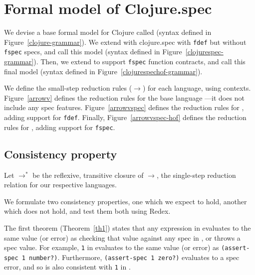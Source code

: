 \chapter{Formal model of Clojure.spec}

%
%

We devise a base formal model for Clojure called \lambdac{}
(syntax defined in Figure~\ref{clojure-grammar}).
We extend \lambdac{} with clojure.spec with \texttt{fdef} but without 
\texttt{fspec} specs, and call
this model \lambdacs{}
(syntax defined in Figure~\ref{clojurespec-grammar}).
Then, we extend \lambdacs{} to support
\texttt{fspec} function contracts, and call this final model \lambdacsf{}
(syntax defined in Figure~\ref{clojurespechof-grammar}).

We define the small-step reduction rules ($\rightarrow$) for each language, using contexts.
Figure~\ref{arrowv} defines the reduction rules for 
the base language \lambdac{}---it does not include any spec features.
Figure~\ref{arrowvspec} defines the reduction rules for 
\lambdacs{}, adding support for \texttt{fdef}.
Finally, Figure~\ref{arrowvspec-hof} defines the reduction rules for 
\lambdacsf{}, adding support for \texttt{fspec}.

\section{Consistency property}

Let $\rightarrow^{*}$ be the reflexive, transitive closure of $\rightarrow$,
the single-step reduction relation for our respective languages.

We formulate two consistency properties, one which we expect to hold, another
which does not hold, and test them both using Redex.

The first theorem (Theorem~\ref{th1}) states that any expression in \lambdac{}
evaluates to the same value (or error) as checking that value against
any spec in \lambdacs{}, or throws a spec value.
For example, \texttt{1} in \lambdac{} evaluates to the same value (or error)
as \texttt{(assert-spec 1 number?)}. Furthermore, \texttt{(assert-spec 1 zero?)} 
evaluates to a spec error, and so is also consistent with \texttt{1}
in \lambdac{}.


